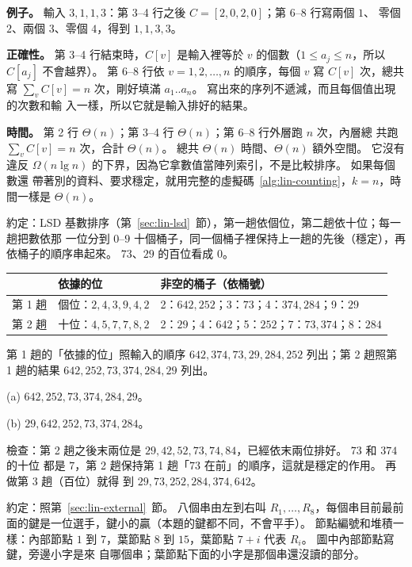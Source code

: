\textbf{例子。} 輸入 $3, 1, 1, 3$：第 3--4 行之後 $C = [2, 0, 2, 0]$；第 6--8 行寫兩個 $1$、
零個 $2$、兩個 $3$、零個 $4$，得到 $1, 1, 3, 3$。

\textbf{正確性。} 第 3--4 行結束時，$C[v]$ 是輸入裡等於 $v$ 的個數（$1 \le a_j \le n$，所以
$C[a_j]$ 不會越界）。 第 6--8 行依 $v = 1, 2, \ldots, n$ 的順序，每個 $v$ 寫 $C[v]$ 次，總共
寫 $\sum_v C[v] = n$ 次，剛好填滿 $a_1..a_n$。 寫出來的序列不遞減，而且每個值出現的次數和輸
入一樣，所以它就是輸入排好的結果。

\textbf{時間。} 第 2 行 $\Theta(n)$；第 3--4 行 $\Theta(n)$；第 6--8 行外層跑 $n$ 次，內層總
共跑 $\sum_v C[v] = n$ 次，合計 $\Theta(n)$。 總共 $\Theta(n)$ 時間、$\Theta(n)$ 額外空間。
它沒有違反 $\Omega(n \lg n)$ 的下界，因為它拿數值當陣列索引，不是比較排序。 如果每個數還
帶著別的資料、要求穩定，就用完整的虛擬碼~\ref{alg:lin-counting}，$k = n$，時間一樣是
$\Theta(n)$。

約定：LSD 基數排序（第~\ref{sec:lin-lsd}~節），第一趟依個位，第二趟依十位；每一趟把數依那
一位分到 $0$--$9$ 十個桶子，同一個桶子裡保持上一趟的先後（穩定），再依桶子的順序串起來。
$73$、$29$ 的百位看成 $0$。

\begin{center}
\begin{tabular}{lll}
\toprule
 & 依據的位 & 非空的桶子（依桶號） \\
\midrule
第 1 趟 & 個位：$2, 4, 3, 9, 4, 2$ & 2：$642, 252$；3：$73$；4：$374, 284$；9：$29$ \\
第 2 趟 & 十位：$4, 5, 7, 7, 8, 2$ & 2：$29$；4：$642$；5：$252$；7：$73, 374$；8：$284$ \\
\bottomrule
\end{tabular}
\end{center}

第 1 趟的「依據的位」照輸入的順序 $642, 374, 73, 29, 284, 252$ 列出；第 2 趟照第 1 趟的結果
$642, 252, 73, 374, 284, 29$ 列出。

(a) $642, 252, 73, 374, 284, 29$。

(b) $29, 642, 252, 73, 374, 284$。

檢查：第 2 趟之後末兩位是 $29, 42, 52, 73, 74, 84$，已經依末兩位排好。 $73$ 和 $374$ 的十位
都是 $7$，第 2 趟保持第 1 趟「$73$ 在前」的順序，這就是穩定的作用。 再做第 3 趟（百位）就得
到 $29, 73, 252, 284, 374, 642$。

約定：照第~\ref{sec:lin-external}~節。 八個串由左到右叫 $R_1, \ldots, R_8$，每個串目前最前
面的鍵是一位選手，鍵小的贏（本題的鍵都不同，不會平手）。 節點編號和堆積一樣：內部節點
$1$ 到 $7$，葉節點 $8$ 到 $15$，葉節點 $7 + i$ 代表 $R_i$。 圖中內部節點寫鍵，旁邊小字是來
自哪個串；葉節點下面的小字是那個串還沒讀的部分。

